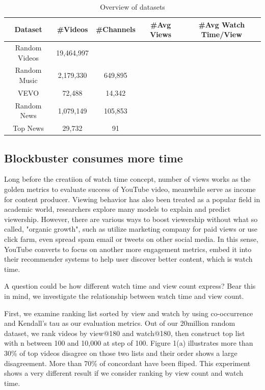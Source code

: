 \begin{table}
  \caption{Overview of datasets}
  \label{table:1}
  \begin{tabular}{ccccc}
    \toprule
    Dataset & \#Videos & \#Channels & \#Avg Views & \#Avg Watch Time/View \\
    \midrule
    Random Videos & 19,464,997 &  & \\ 
    Random Music & 2,179,330 & 649,895 & \\ 
    VEVO & 72,488 & 14,342 & \\
    Random News & 1,079,149 & 105,853 & \\
    Top News & 29,732 & 91 & \\
  \bottomrule
\end{tabular}
\end{table}

\subsection{Blockbuster consumes more time}

Long before the creatiion of watch time concept, number of views works as the golden metrics to evaluate success of YouTube video, meanwhile serve as income for content producer. Viewing behavior has also been treated as a popular field in academic world, researchers explore many models to explain and predict viewership. However, there are various ways to boost viewership without what so called, "organic growth", such as utilize marketing company for paid views or use click farm, even spread spam email or tweets on other social media. In this sense, YouTube converts to focus on another more engagement metrics, embed it into their recommender systems to help user discover better content, which is watch time.

A question could be how different watch time and view count express? Bear this in mind, we investigate the relationship between watch time and view count.

First, we examine ranking list sorted by view and watch by using co-occurrence and Kendall's tau as our evaluation metrics. Out of our 20million random dataset, we rank videos by view@180 and watch@180, then construct top list with n between 100 and 10,000 at step of 100. Figure 1(a) illustrates more than 30\% of top videos disagree on those two lists and their order shows a large disagreement. More than 70\% of concordant have been fliped. This experiment shows a very different result if we consider ranking by view count and watch time.

